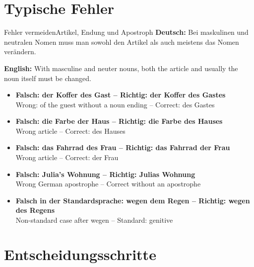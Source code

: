 \documentclass[a4paper,11pt]{article}
\newcommand{\GermanText}[1]{\textbf{Deutsch: }#1\par}
\newcommand{\EnglishText}[1]{{\small\color{SoftGray}\textbf{English: }#1\par}}
\newcommand{\ExampleItem}[2]{\item \textbf{#1}\\{\small\color{SoftGray}#2}}
\begin{document}
    \section{Typische Fehler}

        \begin{grammarentry}{Fehler vermeiden}{Artikel, Endung und Apostroph}
            \GermanText{Bei maskulinen und neutralen Nomen muss man sowohl den Artikel als auch meistens das Nomen verändern.}
            \EnglishText{With masculine and neuter nouns, both the article and usually the noun itself must be changed.}
        \end{grammarentry}

        \begin{exbox}
            \begin{itemize}
                \ExampleItem{Falsch: der Koffer des Gast -- Richtig: der Koffer des Gastes}{Wrong: of the guest without a noun ending -- Correct: des Gastes}
                \ExampleItem{Falsch: die Farbe der Haus -- Richtig: die Farbe des Hauses}{Wrong article -- Correct: des Hauses}
                \ExampleItem{Falsch: das Fahrrad des Frau -- Richtig: das Fahrrad der Frau}{Wrong article -- Correct: der Frau}
                \ExampleItem{Falsch: Julia's Wohnung -- Richtig: Julias Wohnung}{Wrong German apostrophe -- Correct without an apostrophe}
                \ExampleItem{Falsch in der Standardsprache: wegen dem Regen -- Richtig: wegen des Regens}{Non-standard case after wegen -- Standard: genitive}
            \end{itemize}
        \end{exbox}

    \section{Entscheidungsschritte}
\end{document}
